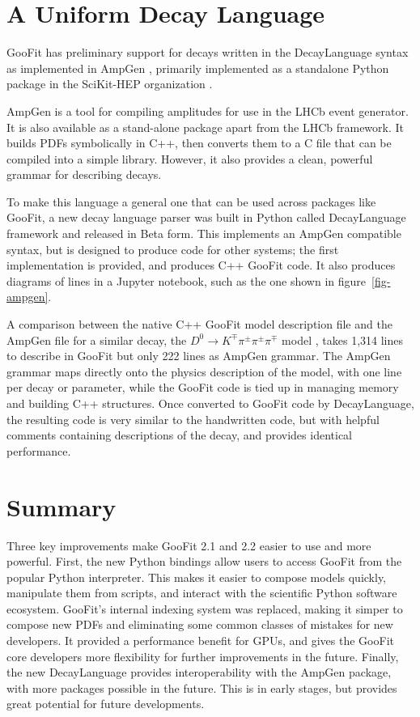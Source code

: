 \documentclass{webofc}
\begin{document}
\section{A Uniform Decay Language}
\label{sec-ampgen}

GooFit has preliminary support for decays written in the DecayLanguage syntax as implemented in AmpGen \cite{lib:AmpGen}, primarily implemented as a standalone Python package in the SciKit-HEP organization \cite{org:scikithep}.

AmpGen is a tool for compiling amplitudes for use in the LHCb event generator. It is also available as a stand-alone package apart from the LHCb framework. It builds PDFs symbolically in C++, then converts them to a C file that can be compiled into a simple library. However, it also provides a clean, powerful grammar for describing decays.

To make this language a general one that can be used across packages like GooFit, a new decay language parser was built in Python called DecayLanguage framework and released in Beta form. This implements an AmpGen compatible syntax, but is designed to produce code for other systems; the first implementation is provided, and produces C++ GooFit code. It also produces diagrams of lines in a Jupyter notebook, such as the one shown in figure~\ref{fig-ampgen}.

A comparison between the native C++ GooFit model description file and the AmpGen file for a similar decay, the  $D^0\rightarrow K^{\mp} \pi^{\pm} \pi^{\pm} \pi^{\mp}$ model \cite{paper:kthreepi}, takes 1,314 lines to describe in GooFit but only 222 lines as AmpGen grammar. The AmpGen grammar maps directly onto the physics description of the model, with one line per decay or parameter, while the GooFit code is tied up in managing memory and building C++ structures. Once converted to GooFit code by DecayLanguage, the resulting code is very similar to the handwritten code, but with helpful comments containing descriptions of the decay, and provides identical performance.



\section{Summary}
\label{sec-summary}

Three key improvements make GooFit 2.1 and 2.2 easier to use and more powerful. First, the new Python bindings allow users to access GooFit from the popular Python interpreter. This makes it easier to compose models quickly, manipulate them from scripts, and interact with the scientific Python software ecosystem.
GooFit's internal indexing system was replaced, making it simper to compose new PDFs and eliminating some common classes of mistakes for new developers. It provided a performance benefit for GPUs, and gives the GooFit core developers more flexibility for further improvements in the future.
Finally, the new DecayLanguage provides interoperability with the AmpGen package, with more packages possible in the future. This is in early stages, but provides great potential for future developments.
\end{document}
